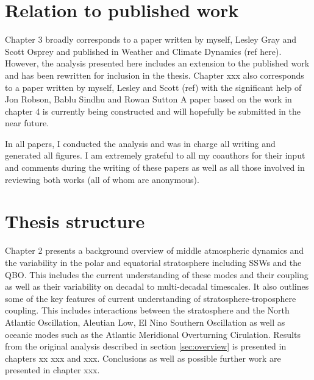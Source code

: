 \section{Relation to published work}

Chapter 3 broadly corresponds to a paper written by myself, Lesley Gray and Scott Osprey and published in Weather and Climate Dynamics (ref here). However, the analysis presented here includes an extension to the published work and has been rewritten for inclusion in the thesis. Chapter xxx also corresponds to a paper written by myself, Lesley and Scott (ref) with the significant help of Jon Robson, Bablu Sindhu and Rowan Sutton  A paper based on the work in chapter 4 is currently being constructed and will hopefully be submitted in the near future. 

In all papers, I conducted the analysis and was in charge all writing and generated all figures. I am extremely grateful to all my coauthors for their input and comments during the writing of these papers as well as all those involved in reviewing both works (all of whom are anonymous).  

\section{Thesis structure}
Chapter 2 presents a background overview of middle atmospheric dynamics and the variability in the polar and equatorial stratosphere including SSWs and the QBO. This includes the current understanding of these modes and their coupling as well as their variability on decadal to multi-decadal timescales. It also outlines some of the key features of current understanding of stratosphere-troposphere coupling. This includes interactions between the stratosphere and the North Atlantic Oscillation, Aleutian Low, El Nino Southern Oscillation as well as oceanic modes such as the Atlantic Meridional Overturning Cirulation. Results from the original analysis described in section \ref{sec:overview} is presented in chapters xx xxx and xxx. Conclusions as well as possible further work are presented in chapter xxx.










